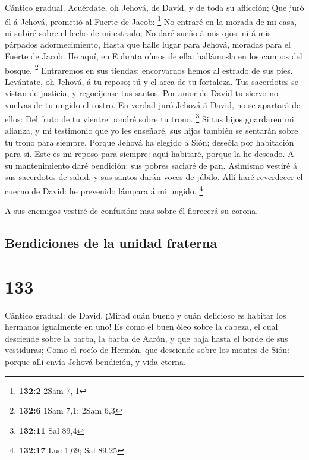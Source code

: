  Cántico gradual. Acuérdate, oh Jehová, de David, y de toda
su aflicción;  Que juró él á Jehová, prometió al Fuerte de
Jacob: \footnote{\textbf{132:2} 2Sam 7,-1}  No entraré en la
morada de mi casa, ni subiré sobre el lecho de mi estrado; 
No daré sueño á mis ojos, ni á mis párpados adormecimiento, 
Hasta que halle lugar para Jehová, moradas para el Fuerte de Jacob.
 He aquí, en Ephrata oímos de ella: hallámosla en los campos
del bosque. \footnote{\textbf{132:6} 1Sam 7,1; 2Sam 6,3} 
Entraremos en sus tiendas; encorvarnos hemos al estrado de sus pies.
 Levántate, oh Jehová, á tu reposo; tú y el arca de tu
fortaleza.  Tus sacerdotes se vistan de justicia, y
regocíjense tus santos.  Por amor de David tu siervo no
vuelvas de tu ungido el rostro.  En verdad juró Jehová á
David, no se apartará de ellos: Del fruto de tu vientre pondré sobre tu
trono. \footnote{\textbf{132:11} Sal 89,4}  Si tus hijos
guardaren mi alianza, y mi testimonio que yo les enseñaré, sus hijos
también se sentarán sobre tu trono para siempre.  Porque
Jehová ha elegido á Sión; deseóla por habitación para sí. 
Este es mi reposo para siempre: aquí habitaré, porque la he deseado.
 A su mantenimiento daré bendición: sus pobres saciaré de
pan.  Asimismo vestiré á sus sacerdotes de salud, y sus
santos darán voces de júbilo.  Allí haré reverdecer el
cuerno de David: he prevenido lámpara á mi ungido. \footnote{\textbf{132:17}
  Luc 1,69; Sal 89,25}

 A sus enemigos vestiré de confusión: mas sobre él
florecerá su corona.

\hypertarget{bendiciones-de-la-unidad-fraterna}{%
\subsection{Bendiciones de la unidad
fraterna}\label{bendiciones-de-la-unidad-fraterna}}

\hypertarget{section-132}{%
\section{133}\label{section-132}}

 Cántico gradual: de David. ¡Mirad cuán bueno y cuán
delicioso es habitar los hermanos igualmente en uno!  Es
como el buen óleo sobre la cabeza, el cual desciende sobre la barba, la
barba de Aarón, y que baja hasta el borde de sus vestiduras;
 Como el rocío de Hermón, que desciende sobre los montes de
Sión: porque allí envía Jehová bendición, y vida eterna.

